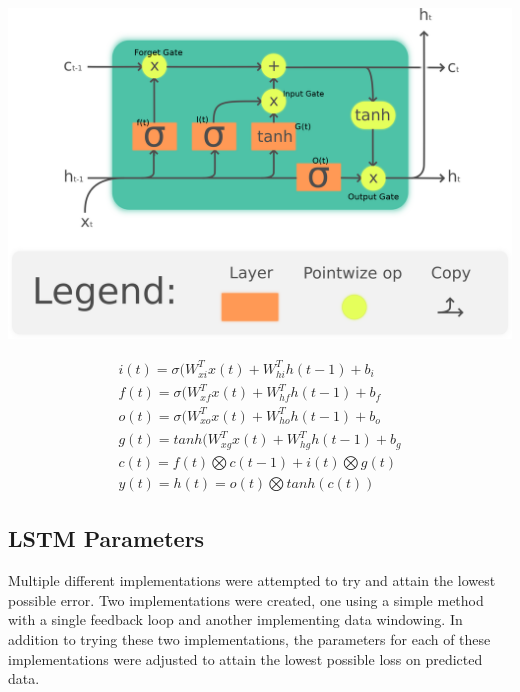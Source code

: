 \noindent\begin{minipage}{.55\textwidth}
   \centering
   \includegraphics[width=\linewidth]{lstm/neuron_lstm.png}
   \label{fig:lstm_neuron}
\end{minipage}
\begin{minipage}{.43\textwidth}
\begin{align}
        i(t) = \sigma(W_{xi}^Tx(t) + W_{hi}^Th(t-1) + b_i \\
        f(t) = \sigma(W_{xf}^Tx(t) + W_{hf}^Th(t-1) + b_f\\
        o(t) = \sigma(W_{xo}^Tx(t) + W_{ho}^Th(t-1) + b_o\\
        g(t) = tanh(W_{xg}^Tx(t) + W_{hg}^Th(t-1) + b_g\\
        c(t) = f(t) \bigotimes c(t-1) + i(t) \bigotimes g(t)\\
        y(t) = h(t) = o(t) \bigotimes tanh(c(t))
\end{align}
\end{minipage}

\subsection{LSTM Parameters}
Multiple different implementations were attempted to try and attain the lowest possible error. Two implementations were created, one using a simple method with a single feedback loop and another implementing data windowing. In addition to trying these two implementations, the parameters for each of these implementations were adjusted to attain the lowest possible loss on predicted data. 
